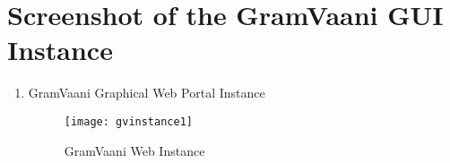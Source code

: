 \chapter{Screenshot of the GramVaani GUI Instance}

\begin{enumerate}

\item GramVaani Graphical Web Portal Instance
\begin{figure}[here]
\begin{center}   
\texttt{[image: gvinstance1]}
\caption{GramVaani Web Instance}
\label{fig:gvinstance1}
\end{center}
\end{figure}

\end{enumerate}